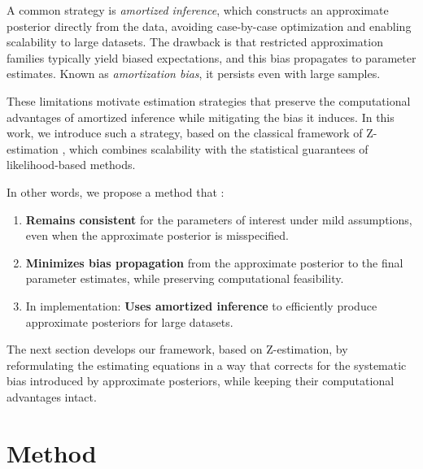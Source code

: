 \documentclass[twoside,11pt]{article}
\begin{document}
A common strategy is \emph{amortized inference}, which constructs an approximate posterior directly from the data, avoiding case-by-case optimization and enabling scalability to large datasets. The drawback is that restricted approximation families typically yield biased expectations, and this bias propagates to parameter estimates. Known as \emph{amortization bias}, it persists even with large samples.  

These limitations motivate estimation strategies that preserve the computational advantages of amortized inference while mitigating the bias it induces. In this work, we introduce such a strategy, based on the classical framework of Z-estimation \citep{vandervaart1998}, which combines scalability with the statistical guarantees of likelihood-based methods.  


In other words, we propose a method that :
\begin{enumerate}
    \item \textbf{Remains consistent} for the parameters of interest under mild assumptions, even when the approximate posterior is misspecified.
    \item \textbf{Minimizes bias propagation} from the approximate posterior to the final parameter estimates, while preserving computational feasibility.
    \item In implementation: \textbf{Uses amortized inference} to efficiently produce approximate posteriors for large datasets.
\end{enumerate}

The next section develops our framework, based on Z-estimation, by reformulating the estimating equations in a way that corrects for the systematic bias introduced by approximate posteriors, while keeping their computational advantages intact.


































\newpage
\section{Method}
\label{sec:method}
\end{document}
